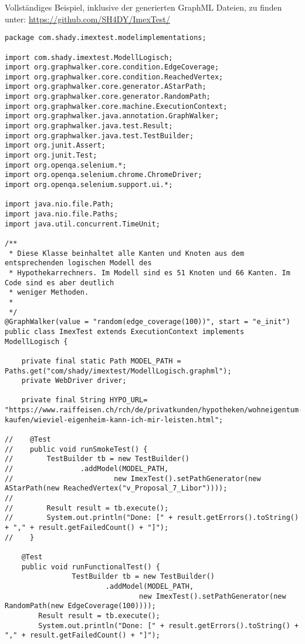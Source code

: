 Vollständiges Beispiel, inklusive der generierten GraphML Dateien, zu finden unter: \url{https://github.com/SH4DY/ImexTest/}
\begin{lstlisting}[caption=ImexTest.java, label=code:gw_selenium]
package com.shady.imextest.modelimplementations;

import com.shady.imextest.ModellLogisch;
import org.graphwalker.core.condition.EdgeCoverage;
import org.graphwalker.core.condition.ReachedVertex;
import org.graphwalker.core.generator.AStarPath;
import org.graphwalker.core.generator.RandomPath;
import org.graphwalker.core.machine.ExecutionContext;
import org.graphwalker.java.annotation.GraphWalker;
import org.graphwalker.java.test.Result;
import org.graphwalker.java.test.TestBuilder;
import org.junit.Assert;
import org.junit.Test;
import org.openqa.selenium.*;
import org.openqa.selenium.chrome.ChromeDriver;
import org.openqa.selenium.support.ui.*;

import java.nio.file.Path;
import java.nio.file.Paths;
import java.util.concurrent.TimeUnit;

/**
 * Diese Klasse beinhaltet alle Kanten und Knoten aus dem entsprechenden logischen Modell des
 * Hypothekarrechners. Im Modell sind es 51 Knoten und 66 Kanten. Im Code sind es aber deutlich
 * weniger Methoden.
 *
 */
@GraphWalker(value = "random(edge_coverage(100))", start = "e_init")
public class ImexTest extends ExecutionContext implements ModellLogisch {

    private final static Path MODEL_PATH = Paths.get("com/shady/imextest/ModellLogisch.graphml");
    private WebDriver driver;

    private final String HYPO_URL= "https://www.raiffeisen.ch/rch/de/privatkunden/hypotheken/wohneigentum-kaufen/wieviel-eigenheim-kann-ich-mir-leisten.html";

//    @Test
//    public void runSmokeTest() {
//        TestBuilder tb = new TestBuilder()
//                .addModel(MODEL_PATH,
//                        new ImexTest().setPathGenerator(new AStarPath(new ReachedVertex("v_Proposal_7_Libor"))));
//
//        Result result = tb.execute();
//        System.out.println("Done: [" + result.getErrors().toString() + "," + result.getFailedCount() + "]");
//    }

    @Test
    public void runFunctionalTest() {
                TestBuilder tb = new TestBuilder()
                        .addModel(MODEL_PATH,
                                new ImexTest().setPathGenerator(new RandomPath(new EdgeCoverage(100))));
        Result result = tb.execute();
        System.out.println("Done: [" + result.getErrors().toString() + "," + result.getFailedCount() + "]");


\end{lstlisting}

